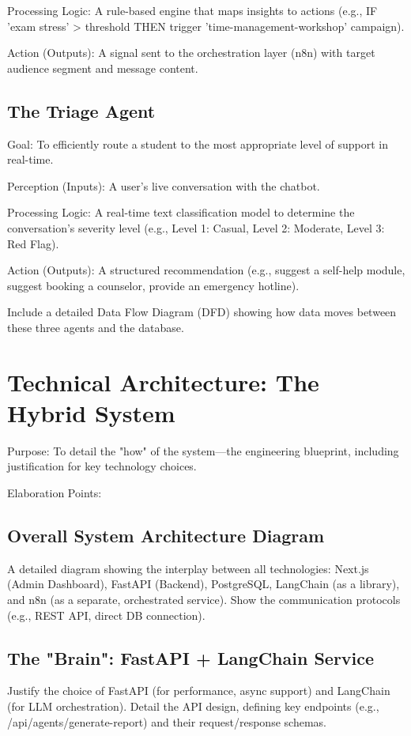 Processing Logic: A rule-based engine that maps insights to actions (e.g., IF 'exam stress' > threshold THEN trigger 'time-management-workshop' campaign).

Action (Outputs): A signal sent to the orchestration layer (n8n) with target audience segment and message content.

\subsection{The Triage Agent}

Goal: To efficiently route a student to the most appropriate level of support in real-time.

Perception (Inputs): A user's live conversation with the chatbot.

Processing Logic: A real-time text classification model to determine the conversation's severity level (e.g., Level 1: Casual, Level 2: Moderate, Level 3: Red Flag).

Action (Outputs): A structured recommendation (e.g., suggest a self-help module, suggest booking a counselor, provide an emergency hotline).

Include a detailed Data Flow Diagram (DFD) showing how data moves between these three agents and the database.

\section{Technical Architecture: The Hybrid System}
Purpose: To detail the "how" of the system—the engineering blueprint, including justification for key technology choices.

Elaboration Points:

\subsection{Overall System Architecture Diagram}
A detailed diagram showing the interplay between all technologies: Next.js (Admin Dashboard), FastAPI (Backend), PostgreSQL, LangChain (as a library), and n8n (as a separate, orchestrated service). Show the communication protocols (e.g., REST API, direct DB connection).

\subsection{The "Brain": FastAPI + LangChain Service}
Justify the choice of FastAPI (for performance, async support) and LangChain (for LLM orchestration). Detail the API design, defining key endpoints (e.g., /api/agents/generate-report) and their request/response schemas.

